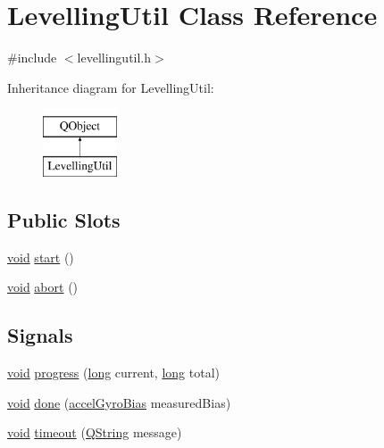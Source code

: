 \hypertarget{class_levelling_util}{\section{Levelling\-Util Class Reference}
\label{class_levelling_util}
}


{\ttfamily \#include $<$levellingutil.\-h$>$}

Inheritance diagram for Levelling\-Util\-:\begin{figure}[H]
\begin{center}
\leavevmode
\includegraphics[height=2.000000cm]{class_levelling_util}
\end{center}
\end{figure}
\subsection*{Public Slots}
\begin{DoxyCompactItemize}
\item 
\hyperlink{group___u_a_v_objects_plugin_ga444cf2ff3f0ecbe028adce838d373f5c}{void} \hyperlink{group___levelling_util_gadeda2d2af8921e86d9d28baa731bdee1}{start} ()
\item 
\hyperlink{group___u_a_v_objects_plugin_ga444cf2ff3f0ecbe028adce838d373f5c}{void} \hyperlink{group___levelling_util_ga0fda00c22049a8b2e594de88d8155ad7}{abort} ()
\end{DoxyCompactItemize}
\subsection*{Signals}
\begin{DoxyCompactItemize}
\item 
\hyperlink{group___u_a_v_objects_plugin_ga444cf2ff3f0ecbe028adce838d373f5c}{void} \hyperlink{group___levelling_util_gab523cee804f97da56e83162210546c36}{progress} (\hyperlink{ioapi_8h_a3c7b35ad9dab18b8310343c201f7b27e}{long} current, \hyperlink{ioapi_8h_a3c7b35ad9dab18b8310343c201f7b27e}{long} total)
\item 
\hyperlink{group___u_a_v_objects_plugin_ga444cf2ff3f0ecbe028adce838d373f5c}{void} \hyperlink{group___levelling_util_ga7fde9c70306e392dd49fef6c2f17f983}{done} (\hyperlink{structaccel_gyro_bias}{accel\-Gyro\-Bias} measured\-Bias)
\item 
\hyperlink{group___u_a_v_objects_plugin_ga444cf2ff3f0ecbe028adce838d373f5c}{void} \hyperlink{group___levelling_util_gac10890045336d643555fb7bc687e6d0a}{timeout} (\hyperlink{group___u_a_v_objects_plugin_gab9d252f49c333c94a72f97ce3105a32d}{Q\-String} message)
\end{DoxyCompactItemize}
